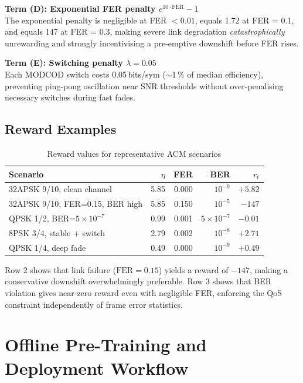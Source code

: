 \documentclass[12pt,a4paper]{report}
\begin{document}
\textbf{Term (D): Exponential FER penalty $e^{10\cdot\text{FER}} - 1$}\\
The exponential penalty is negligible at FER $< 0.01$, equals 1.72 at
FER = 0.1, and equals 147 at FER = 0.3, making severe link degradation
\emph{catastrophically} unrewarding and strongly incentivising a pre-emptive
downshift before FER rises.

\textbf{Term (E): Switching penalty $\lambda = 0.05$}\\
Each MODCOD switch costs 0.05\,bits/sym ($\sim$1\,\% of median efficiency),
preventing ping-pong oscillation near SNR thresholds without over-penalising
necessary switches during fast fades.

\subsection{Reward Examples}

\begin{table}[H]
\centering
\caption{Reward values for representative ACM scenarios}
\label{tab:reward_examples}
\begin{tabular}{p{4.5cm}rrrr}
\toprule
\textbf{Scenario} & $\eta$ & FER & BER & $r_t$ \\
\midrule
32APSK 9/10, clean channel      & 5.85 & 0.000 & $10^{-9}$ & $+5.82$ \\
32APSK 9/10, FER=0.15, BER high & 5.85 & 0.150 & $10^{-5}$ & $-147$  \\
QPSK 1/2, BER=$5\times10^{-7}$ & 0.99 & 0.001 & $5\times10^{-7}$ & $-0.01$ \\
8PSK 3/4, stable + switch       & 2.79 & 0.002 & $10^{-8}$ & $+2.71$ \\
QPSK 1/4, deep fade             & 0.49 & 0.000 & $10^{-9}$ & $+0.49$ \\
\bottomrule
\end{tabular}
\end{table}

\noindent
Row 2 shows that link failure ($\text{FER}=0.15$) yields a reward of $-147$,
making a conservative downshift overwhelmingly preferable. Row 3 shows that
BER violation gives near-zero reward even with negligible FER, enforcing
the QoS constraint independently of frame error statistics.

\section{Offline Pre-Training and Deployment Workflow}
\label{sec:pretrain}
\end{document}
